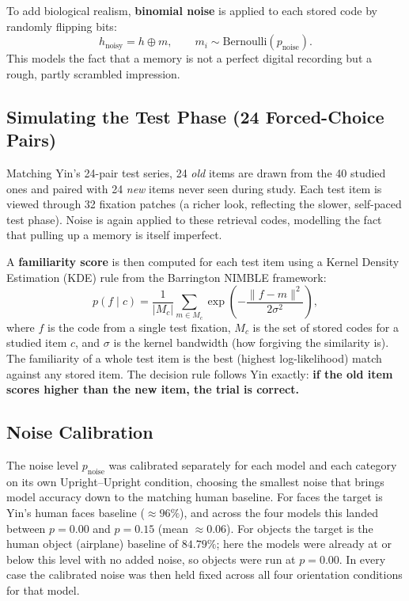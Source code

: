 \documentclass[11pt]{article}
\begin{document}
To add biological realism, \textbf{binomial noise} is applied to each stored code by randomly
flipping bits:
\[
h_{\text{noisy}} = h \oplus m, \qquad m_i \sim \text{Bernoulli}(p_{\text{noise}}).
\]
This models the fact that a memory is not a perfect digital recording but a rough, partly
scrambled impression.

\subsection{Simulating the Test Phase (24 Forced-Choice Pairs)}

Matching Yin's 24-pair test series, 24 \emph{old} items are drawn from the 40 studied ones
and paired with 24 \emph{new} items never seen during study. Each test item is viewed through
32 fixation patches (a richer look, reflecting the slower, self-paced test phase). Noise is
again applied to these retrieval codes, modelling the fact that pulling up a memory is itself
imperfect.

A \textbf{familiarity score} is then computed for each test item using a Kernel Density
Estimation (KDE) rule from the Barrington NIMBLE framework:
\[
p(f \mid c) = \frac{1}{|M_c|} \sum_{m \in M_c}
\exp\!\left(-\frac{\lVert f - m \rVert^2}{2\sigma^2}\right),
\]
where $f$ is the code from a single test fixation, $M_c$ is the set of stored codes for a
studied item $c$, and $\sigma$ is the kernel bandwidth (how forgiving the similarity is). The
familiarity of a whole test item is the best (highest log-likelihood) match against any
stored item. The decision rule follows Yin exactly: \textbf{if the old item scores higher
than the new item, the trial is correct.}

\subsection{Noise Calibration}

The noise level $p_{\text{noise}}$ was calibrated separately for each model and each category
on its own Upright--Upright condition, choosing the smallest noise that brings model accuracy
down to the matching human baseline. For faces the target is Yin's human faces baseline
($\approx 96\%$), and across the four models this landed between $p = 0.00$ and $p = 0.15$
(mean $\approx 0.06$). For objects the target is the human object (airplane) baseline of
$84.79\%$; here the models were already at or below this level with no added noise, so objects
were run at $p = 0.00$. In every case the calibrated noise was then held fixed across all four
orientation conditions for that model.
\end{document}
